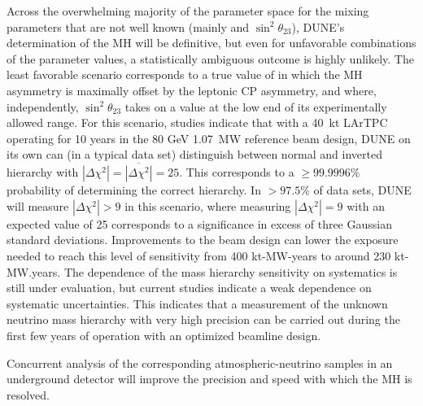 Across the overwhelming majority of the parameter space for the mixing
parameters that are not well known (mainly \deltacp and
$\sin^2{\theta_{23}}$), DUNE's determination of the MH will be
definitive, but even for unfavorable combinations of the parameter
values, a statistically ambiguous outcome is highly unlikely.  The
least favorable scenario corresponds to a true value of \deltacp in
which the MH asymmetry is maximally offset by the leptonic CP
asymmetry, and where, independently, $\sin^2{\theta_{23}}$ takes on a
value at the low end of its experimentally allowed range.  For
this %
scenario, studies indicate that with a 40~kt %
LArTPC operating for %
10 years in the 80 GeV 1.07~MW reference beam design, DUNE on its own
can (in a typical data set) distinguish between normal and inverted
hierarchy with $|\Delta \chi^2| = \overline{|\Delta \chi^2|} = 25$.
This corresponds to a $\geq 99.9996\%$ probability of determining the
correct hierarchy.  In $>97.5\%$ of data sets, DUNE will measure
$|\Delta \chi^2| > 9$ in this scenario, where measuring
$|\Delta\chi^2| = 9$ with an expected value of \num{25} corresponds to
a significance in excess of three Gaussian standard
deviations. Improvements to the beam design can lower the exposure
needed to reach this level of sensitivity from 400 kt-MW-years to
around 230 kt-MW.years. The dependence of the mass hierarchy
sensitivity on systematics is still under evaluation, but current
studies indicate a weak dependence on systematic uncertainties. This
indicates that a measurement of the unknown neutrino mass hierarchy
with very high precision can be carried out during the first few years
of operation with an optimized beamline design.

Concurrent analysis of the corresponding atmospheric-neutrino samples
in an underground detector will improve the precision and speed with
which the MH is resolved.


